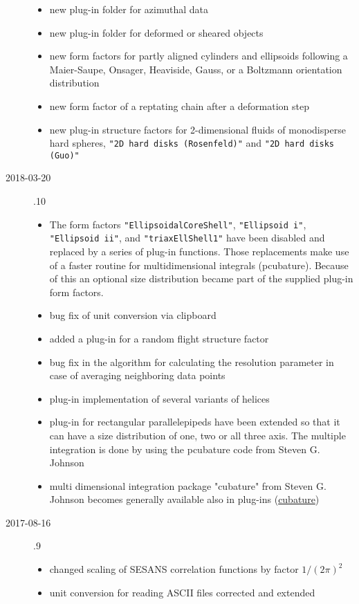 \begin{description}
\begin{itemize}
    \item new plug-in folder for azimuthal data
    \item new plug-in folder for deformed or sheared objects
    \item new form factors for partly aligned cylinders and ellipsoids following a Maier-Saupe, Onsager, Heaviside, Gauss, or a Boltzmann orientation distribution
    \item new form factor of a reptating chain after a deformation step
    \item new plug-in structure factors for 2-dimensional fluids of monodisperse hard spheres, \texttt{"2D hard disks (Rosenfeld)"} and \texttt{"2D hard disks (Guo)"}
    \end{itemize}
\item[2018-03-20] .10
    \begin{itemize}
    \item The form factors \texttt{"EllipsoidalCoreShell"}, \texttt{"Ellipsoid i"}, \texttt{"Ellipsoid ii"}, and \texttt{"triaxEllShell1"} have been disabled and replaced by a series of plug-in functions. Those replacements make use of a faster routine for multidimensional integrals (pcubature). Because of this an optional size distribution became part of the supplied plug-in form factors.
    \item bug fix of unit conversion via clipboard
    \item added a plug-in for a random flight structure factor
    \item bug fix in the algorithm for calculating the resolution parameter in case of averaging neighboring data points
    \item  plug-in implementation of several variants of helices
    \item plug-in for rectangular parallelepipeds have been extended so that it can have a size distribution of one, two or all three axis. The multiple integration is done by using the pcubature code from  Steven G. Johnson
    \item multi dimensional integration package "cubature" from  Steven G. Johnson becomes generally available also in plug-ins (\href{https://github.com/stevengj/cubature}{cubature})
    \end{itemize}
\item[2017-08-16] .9
    \begin{itemize}
    \item changed scaling of SESANS correlation functions by factor $1/(2\pi)^2$
    \item unit conversion for reading ASCII files corrected and extended

\end{itemize}
\end{description}
